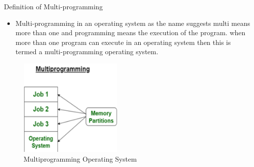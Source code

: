 \documentclass{beamer}
\begin{document}
\begin{frame}{Definition of Multi-programming}
	
        \begin{itemize}
            \item Multi-programming in an operating system as the name suggests multi means more than one and programming means the execution of the program. when more than one program can execute in an operating system then this is termed a multi-programming operating system.
        \end{itemize}
        \begin{figure}[h]
        \begin{center}
        
        
        \includegraphics[width=0.45\textwidth , height=0.5\textheight]{Picture1}
        
        \end{center}
        \caption{Multiprogramming Operating System}
        \end{figure}
		
\end{frame}
\end{document}
